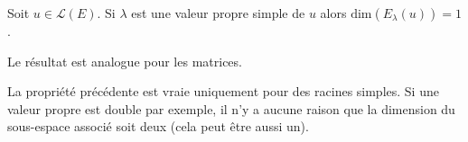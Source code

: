 \documentclass[french,11pt,twoside]{VcCours}
\begin{document}
\begin{Demonstration}{} 
\newpage

\vspace*{5cm}
\end{Demonstration}

\begin{Corollaire}{} Soit $u \in \mathcal{L}(E)$. Si $\lambda$ est une valeur propre simple de $u$ alors $\textrm{dim}(E_{\lambda}(u))=1$.

Le résultat est analogue pour les matrices.
\end{Corollaire}

\begin{Demonstration}{} 

\vspace{3cm}
\end{Demonstration}


\begin{Remarque}[\alerte]{} La propriété précédente est vraie uniquement pour des racines simples. Si une valeur propre est double par exemple, il n'y a aucune raison que la dimension du sous-espace associé soit deux (cela peut être aussi un).
\end{Remarque}
\end{document}
